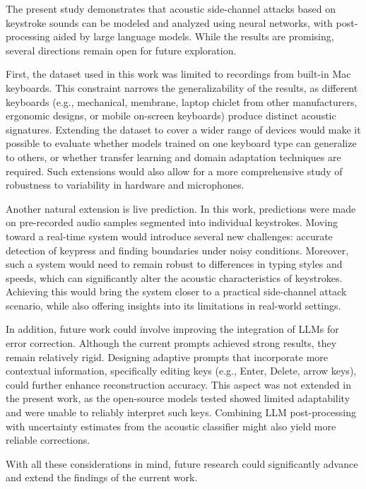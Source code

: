 \documentclass[a4paper,11pt,twoside]{report}
\theoremstyle{definition}
\begin{document}
The present study demonstrates that acoustic side-channel attacks based on keystroke sounds can be modeled and analyzed using neural networks, with post-processing aided by large language models. While the results are promising, several directions remain open for future exploration.

First, the dataset used in this work was limited to recordings from built-in Mac keyboards. This constraint narrows the generalizability of the results, as different keyboards (e.g., mechanical, membrane, laptop chiclet from other manufacturers, ergonomic designs, or mobile on-screen keyboards) produce distinct acoustic signatures. Extending the dataset to cover a wider range of devices would make it possible to evaluate whether models trained on one keyboard type can generalize to others, or whether transfer learning and domain adaptation techniques are required. Such extensions would also allow for a more comprehensive study of robustness to variability in hardware and microphones.

Another natural extension is live prediction. In this work, predictions were made on pre-recorded audio samples segmented into individual keystrokes. Moving toward a real-time system would introduce several new challenges: accurate detection of keypress and finding boundaries under noisy conditions. Moreover, such a system would need to remain robust to differences in typing styles and speeds, which can significantly alter the acoustic characteristics of keystrokes. Achieving this would bring the system closer to a practical side-channel attack scenario, while also offering insights into its limitations in real-world settings.

In addition, future work could involve improving the integration of LLMs for error correction. Although the current prompts achieved strong results, they remain relatively rigid. Designing adaptive prompts that incorporate more contextual information, specifically editing keys (e.g., Enter, Delete, arrow keys), could further enhance reconstruction accuracy. This aspect was not extended in the present work, as the open-source models tested showed limited adaptability and were unable to reliably interpret such keys. Combining LLM post-processing with uncertainty estimates from the acoustic classifier might also yield more reliable corrections.

With all these considerations in mind, future research could significantly advance and extend the findings of the current work.

\printbibliography
\end{document}

